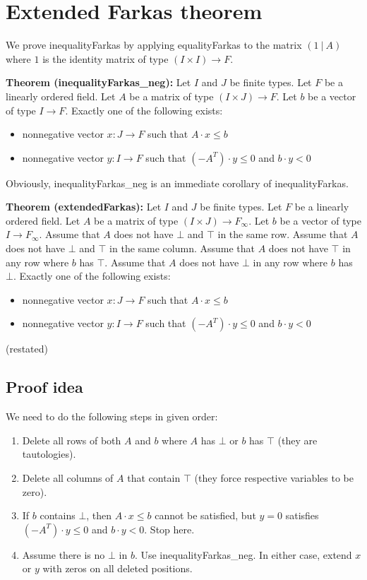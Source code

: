 \documentclass[]{article}
\renewcommand{\.}{\hskip .75pt}
\let\r=\rightarrow
\let\*=\cdot
\begin{document}
\section {Extended Farkas theorem}
\label{extended}

We prove inequalityFarkas by applying equalityFarkas 
to the matrix $(1~|~A)$ where $1$ is the identity matrix of type
$(I \times I) \r F$.

\medskip \noindent
\textbf{Theorem (inequalityFarkas\_neg):}
Let $I$ and $J$ be finite types.
Let $F$ be a linearly ordered field.
Let $A$ be a matrix of type $(I \times J) \r F$.
Let $b$ be a vector of type $I \r F$.
Exactly one of the following exists:
\begin{itemize}
	\item nonnegative vector $x : J \r F$ such that $A \* x \le b$
	\item nonnegative vector $y : I \r F$ such that $(-A^T) \* y \le 0$ and $b \* y < 0$
\end{itemize}
Obviously, inequalityFarkas\_neg is an immediate corollary of inequalityFarkas.

\medskip \noindent
\textbf{Theorem (extendedFarkas):}
Let $I$ and $J$ be finite types.
Let $F$ be a linearly ordered field.
Let $A$ be a matrix of type $(I \times J) \r F_\infty$.
Let $b$ be a vector of type $I \r F_\infty$.
Assume that $A$ does not have $\bot$ and $\top$ in the same row.
Assume that $A$ does not have $\bot$ and $\top$ in the same column.
Assume that $A$ does not have $\top$ in any row where $b$ has $\top$.
Assume that $A$ does not have $\bot$ in any row where $b$ has~$\bot$.
Exactly one of the following exists:
\begin{itemize}
\item nonnegative vector $x : J \r F$ such that $A \* x \le b$
\item nonnegative vector $y : I \r F$ such that $(-A^T) \* y \le 0$ and $b \* y < 0$
\end{itemize}
(restated)

\subsection{Proof idea}
We need to do the following steps in given order:
\begin{enumerate}
\item Delete all rows of both $A$ and $b$ where $A$ has $\bot$ or $b$ has $\top$
(they are tautologies).
\item Delete all columns of $A$ that contain $\top$
(they force respective variables to be zero).
\item If $b$ contains $\bot$, then $A \* x \le b$ cannot be satisfied,
but $y = 0$ satisfies $(-A^T) \* y \le 0$ and $b \* y < 0$. Stop here.
\item Assume there is no $\bot$ in $b$. Use inequalityFarkas\_neg.
In either case, extend $x$ or $y$ with zeros on all deleted positions.
\end{enumerate}
\end{document}
